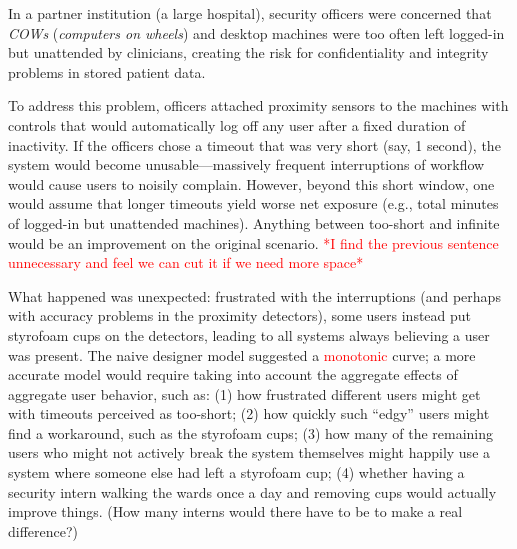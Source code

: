 \documentclass{acm_proc_article-sp}
\newcommand{\ignore}[1] {}
\begin{document}
In a partner institution (a large hospital), security officers were concerned
that {\em COWs} ({\em computers on wheels}) and desktop machines were 
too often left logged-in but unattended by clinicians, creating
the risk for confidentiality and integrity problems in stored patient data.

\ignore{In a partner institution (a large hospital),
clinicians used {\em COWs} ({\em computers on wheels}) and desktop machines.
The security officers were concerned
that these systems were too often left logged-in but unattended, creating
the risk for confidentiality and integrity problems in stored patient data.}

\ignore{To address this problem, the officers attached proximity sensors to the machines and added controls that,
when detecting that a computer had been left unattended but logged-in for a predetermined, fixed, period of time, the user would be automatically logged off.}
To address this problem, officers attached proximity sensors to the machines 
with controls that would automatically log off any user after a fixed 
duration of inactivity.
If the officers chose a timeout that was very short (say, 1 second),
the system would become unusable---massively frequent interruptions of workflow would cause users to noisily complain.  
However, beyond this short window, one would assume that longer timeouts
yield worse net exposure (e.g., total minutes of logged-in but unattended machines).   Anything between too-short and infinite would be an improvement 
on the original scenario.
\textcolor{red}{*I find the previous sentence unnecessary and feel we can cut it if we need more space*}

What happened was unexpected:
frustrated with the interruptions (and perhaps with accuracy problems
in the proximity detectors), some users instead put styrofoam cups on the 
detectors, leading to all systems always believing a user was present.
The naive designer model suggested a \textcolor{red}{monotonic} \ignore{linear} curve; a more accurate model
would require taking into account the aggregate effects of aggregate user  behavior, such as: (1) how frustrated different users might get with timeouts perceived as too-short; (2) how quickly such ``edgy'' users might find a workaround, such as the styrofoam cups; (3) how many of the remaining users who might not actively break the system themselves might happily use a system where someone else had left a styrofoam cup; (4) whether having a security intern walking the wards once a day and removing cups would actually improve things.  (How many interns would there have to be to make a real difference?)
\end{document}
